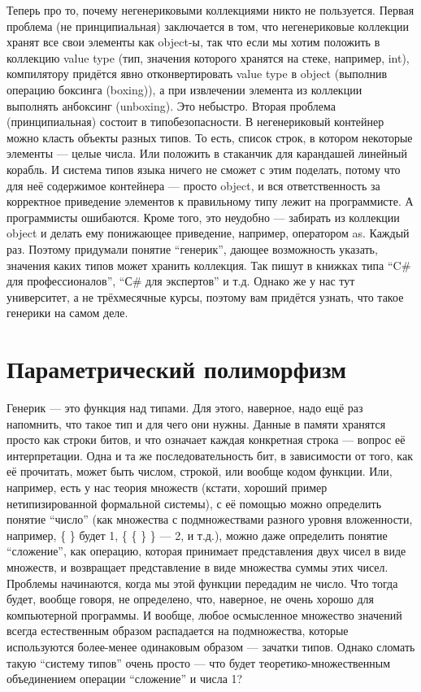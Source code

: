 \documentclass[a5paper]{article}
\begin{document}
Теперь про то, почему негенериковыми коллекциями никто не пользуется. Первая проблема (не принципиальная) заключается в том, что негенериковые коллекции хранят все свои элементы как object-ы, так что если мы хотим положить в коллекцию value type (тип, значения которого хранятся на стеке, например, int), компилятору придётся явно отконвертировать value type в object (выполнив операцию боксинга (boxing)), а при извлечении элемента из коллекции выполнять анбоксинг (unboxing). Это небыстро. Вторая проблема (принципиальная) состоит в типобезопасности. В негенериковый контейнер можно класть объекты разных типов. То есть, список строк, в котором некоторые элементы --- целые числа. Или положить в стаканчик для карандашей линейный корабль. И система типов языка ничего не сможет с этим поделать, потому что для неё содержимое контейнера --- просто object, и вся ответственность за корректное приведение элементов к правильному типу лежит на программисте. А программисты ошибаются. Кроме того, это неудобно --- забирать из коллекции object и делать ему понижающее приведение, например, оператором as. Каждый раз. Поэтому придумали понятие ``генерик'', дающее возможность указать, значения каких типов может хранить коллекция. Так пишут в книжках типа ``C\# для профессионалов'', ``С\# для экспертов'' и т.д. Однако же у нас тут университет, а не трёхмесячные курсы, поэтому вам придётся узнать, что такое генерики на самом деле.

\section{Параметрический полиморфизм}

Генерик --- это функция над типами. Для этого, наверное, надо ещё раз напомнить, что такое тип и для чего они нужны. Данные в памяти хранятся просто как строки битов, и что означает каждая конкретная строка --- вопрос её интерпретации. Одна и та же последовательность бит, в зависимости от того, как её прочитать, может быть числом, строкой, или вообще кодом функции. Или, например, есть у нас теория множеств (кстати, хороший пример нетипизированной формальной системы), с её помощью можно определить понятие ``число'' (как множества с подмножествами разного уровня вложенности, например, \{ \} будет 1, \{ \{ \} \} --- 2, и т.д.), можно даже определить понятие ``сложение'', как операцию, которая принимает представления двух чисел в виде множеств, и возвращает  представление в виде множества суммы этих чисел. Проблемы начинаются, когда мы этой функции передадим не число. Что тогда будет, вообще говоря, не определено, что, наверное, не очень хорошо для компьютерной программы. И вообще, любое осмысленное множество значений всегда естественным образом распадается на подмножества, которые используются более-менее одинаковым образом --- зачатки типов. Однако сломать такую ``систему типов'' очень просто --- что будет теоретико-множественным объединением операции ``сложение'' и числа 1?
\end{document}
